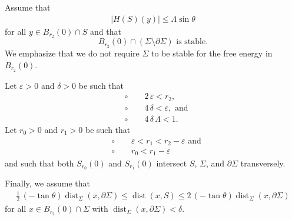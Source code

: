 \documentclass[11pt]{amsart}
\begin{document}
	Assume that 
	\begin{align} \label{H bound} 
	|H(S)(y)|\leq \Lambda\sin\theta
	\end{align} 
	for all $y\in B_{r_2}(0)\cap S$ and that $$\text{$B_{r_2}(0)\cap (\Sigma\setminus \partial \Sigma)$ is stable.}$$ We emphasize that we do not require $\Sigma$ to be  stable for the free energy in $B_{r_2}(0)$.

Let $\varepsilon>0$ and $\delta>0$  be such that 
\begin{equation} \label{epsilon, delta} 
\begin{aligned}
	&\circ \qquad 2\,\varepsilon<r_2,\\
	&\circ\qquad 4\,\delta<\varepsilon,\text{ and}\\
	&\circ\qquad 4\,\delta\,\Lambda<1.
\end{aligned}
\end{equation} 
Let  $r_0>0$ and $r_1>0$ be such that
\begin{equation} \label{r0, r1}
	\begin{aligned} 
&\circ \qquad\varepsilon<r_1<r_2-\varepsilon\text{ and}\\
&\circ \qquad r_0<r_1-\varepsilon
	\end{aligned} 
\end{equation}
 and such that  both $S_{r_0}(0)$ and  $S_{r_1}(0)$ intersect  $S$, $\Sigma$, and $\partial \Sigma$ transversely. 

Finally, we  assume that
\begin{align} \label{assumption 0}
	\frac{1}{2}\,(-\tan\theta)\operatorname{dist}_\Sigma(x, \partial \Sigma)\leq \operatorname{dist}(x,S)\leq 2\,(-\tan\theta)\operatorname{dist}_\Sigma(x, \partial \Sigma)
\end{align}
for all $x\in B_{r_2}(0)\cap \Sigma$ with $\operatorname{dist}_\Sigma(x, \partial \Sigma)<\delta $. 
\end{document}
